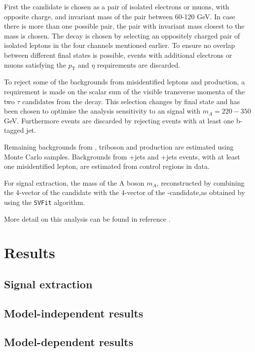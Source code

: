 First the \PZ candidate is chosen as a pair of isolated electrons or muons, with opposite charge, and 
invariant mass of the pair between 60-120 GeV. In case there is more than one possible pair, the 
pair with invariant mass closest to the \PZ mass is chosen. The \htotautau decay is chosen by selecting
an oppositely charged pair of isolated leptons in the four channels mentioned earlier. To ensure no overlap
between different final states is possible, events with additional electrons or muons satisfying the
$p_{\text{T}}$ and $\eta$ requirements are discarded.

To reject some of the backgrounds from misidentified leptons and \ZZ production, a requirement is made
on the scalar sum of the visible transverse momenta of the two $\tau$ candidates from the \htotautau decay.
This selection changes by final state and has been chosen to optimise the analysis sensitivity to an 
\AtoZh signal with $m_A = 220 - 350 $ GeV. Furthermore \ttbar events are discarded by rejecting
events with at least one b-tagged jet. 

Remaining backgrounds from \ZZ, triboson and \ttbar\PZ production are estimated using
Monte Carlo samples. Backgrounds from \PZ+jets %
and \WZ+jets %
events, with at least one misidentified lepton, are estimated from control regions in data.

For signal extraction, the mass of the A boson $m_A$, reconstructed by combining the
4-vector of the \PZ candidate with the 4-vector of the \Ph -candidate,as obtained by using the 
\texttt{SVFit} algorithm.

More detail on this analysis can be found in reference \cite{CMS-HIG-14-034}.




\section{Results}
\label{sec:hhh_results}

\subsection{Signal extraction}
\label{sec:hhh_results_extraction}

\subsection{Model-independent results}
\label{sec:hhh_results_modelindep}


\subsection{Model-dependent results}
\label{sec:hhh_results_modeldep}


